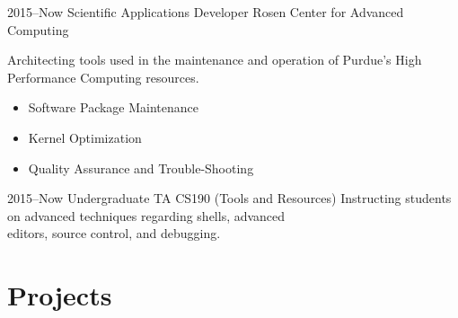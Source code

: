 \documentclass[print]{friggeri-cv} %
\begin{document}
\begin{entrylist}

\entry
{2015--Now}
{Scientific Applications Developer}
{Rosen Center for Advanced Computing}
{Architecting tools used in the maintenance and operation of Purdue's High\\ Performance Computing resources.
\begin{itemize}
	\item Software Package Maintenance
	\item Kernel Optimization
	\item Quality Assurance and Trouble-Shooting
\end{itemize}}

\entry
{2015--Now}
{Undergraduate TA}
{CS190 (Tools and Resources)}
{Instructing students on advanced techniques regarding shells, advanced\\ editors, source control, and debugging.}


\end{entrylist}


\section{Projects}
\end{document}
